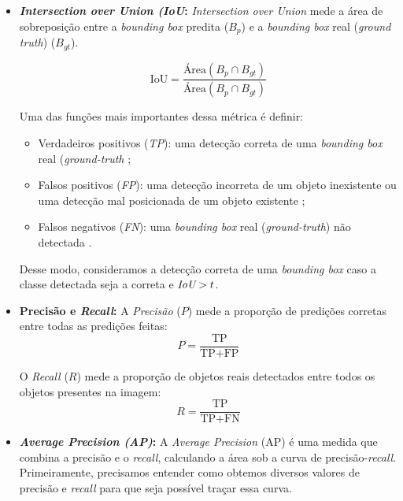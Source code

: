 \begin{itemize}
    \item {\bf \emph{Intersection over Union (IoU}:} 
    \emph{Intersection over Union} mede a área de sobreposição entre a \emph{bounding box} predita ($B_p$) e a \emph{bounding box} real (\emph{ground truth}) ($B_{gt}$).
    \begin{center}
        \[
        \text{IoU} = \dfrac{\text{Área}\left( B_p \cap B_{gt} \right)}{\text{Área}\left( B_p \cap B_{gt}\right)}
        \]
    \end{center}
    Uma das funções mais importantes dessa métrica é definir:
    \begin{itemize}
        \item Verdadeiros positivos (\emph{TP}): uma detecção correta de uma \emph{bounding box} real (\emph{ground-truth} \citep{Padilla2020A};
        \item Falsos positivos (\emph{FP}): uma detecção incorreta de um objeto inexistente ou uma detecção mal posicionada de um objeto existente \citep{Padilla2020A};
        \item Falsos negativos (\emph{FN}): uma \emph{bounding box} real (\emph{ground-truth}) não detectada \citep{Padilla2020A}.
    \end{itemize}

    Desse modo, consideramos a detecção correta de uma \emph{bounding box} caso a classe detectada seja a correta e $\emph{IoU} > t$.
    \item {\bf Precisão e \emph{Recall}:}
    A \emph{Precisão} (\(P\)) mede a proporção de predições corretas entre todas as predições feitas:
    \[
    P = \frac{\text{TP}}{\text{TP} + \text{FP}}
    \]

    O \emph{Recall} (\(R\)) mede a proporção de objetos reais detectados entre todos os objetos presentes na imagem:
    \[
    R = \frac{\text{TP}}{\text{TP} + \text{FN}}
    \]
    \item {\bf \emph{Average Precision (AP)}:}
    A \emph{Average Precision} (AP) é uma medida que combina a precisão e o \emph{recall}, calculando a área sob a curva de precisão-\emph{recall}. Primeiramente, precisamos entender como obtemos diversos valores de precisão e \emph{recall} para que seja possível traçar essa curva.
    

\end{itemize}

